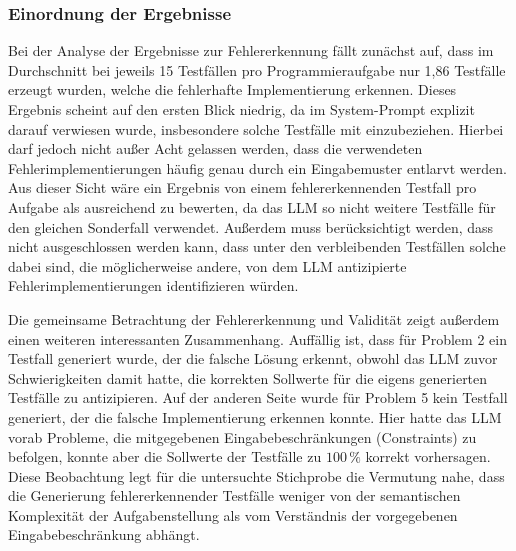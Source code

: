 \subsubsection{Einordnung der Ergebnisse}
Bei der Analyse der Ergebnisse zur Fehlererkennung fällt zunächst auf, dass im Durchschnitt bei jeweils 
15 Testfällen pro Programmieraufgabe nur 1,86 Testfälle erzeugt wurden, welche die fehlerhafte Implementierung
erkennen. Dieses Ergebnis scheint auf den ersten Blick niedrig, da im System-Prompt explizit darauf verwiesen wurde, 
insbesondere solche Testfälle mit einzubeziehen. Hierbei darf jedoch nicht außer Acht gelassen werden, dass die verwendeten 
Fehlerimplementierungen häufig genau durch ein Eingabemuster entlarvt werden. Aus dieser Sicht wäre ein Ergebnis von 
einem fehlererkennenden Testfall pro Aufgabe als ausreichend zu bewerten, da das \ac{LLM} so nicht weitere Testfälle für den gleichen 
Sonderfall verwendet. Außerdem muss berücksichtigt werden, dass nicht ausgeschlossen werden kann, dass unter den verbleibenden 
Testfällen solche dabei sind, die möglicherweise andere, von dem \ac{LLM} antizipierte Fehlerimplementierungen identifizieren 
würden.

Die gemeinsame Betrachtung der Fehlererkennung und Validität zeigt außerdem einen weiteren interessanten Zusammenhang.
Auffällig ist, dass für Problem 2 ein Testfall generiert wurde, der die falsche Lösung erkennt, obwohl das \ac{LLM} zuvor Schwierigkeiten 
damit hatte, die korrekten Sollwerte für die eigens generierten Testfälle zu antizipieren. Auf der anderen Seite wurde für Problem 5 kein 
Testfall generiert, der die falsche Implementierung erkennen konnte. Hier hatte das \ac{LLM} vorab Probleme, die mitgegebenen Eingabebeschränkungen 
(Constraints) zu befolgen, konnte aber die Sollwerte der Testfälle zu \(100\,\%\) korrekt vorhersagen. Diese Beobachtung legt für die untersuchte 
Stichprobe die Vermutung nahe, dass die Generierung fehlererkennender Testfälle weniger von der semantischen Komplexität der Aufgabenstellung als 
vom Verständnis der vorgegebenen Eingabebeschränkung abhängt.

\newpage